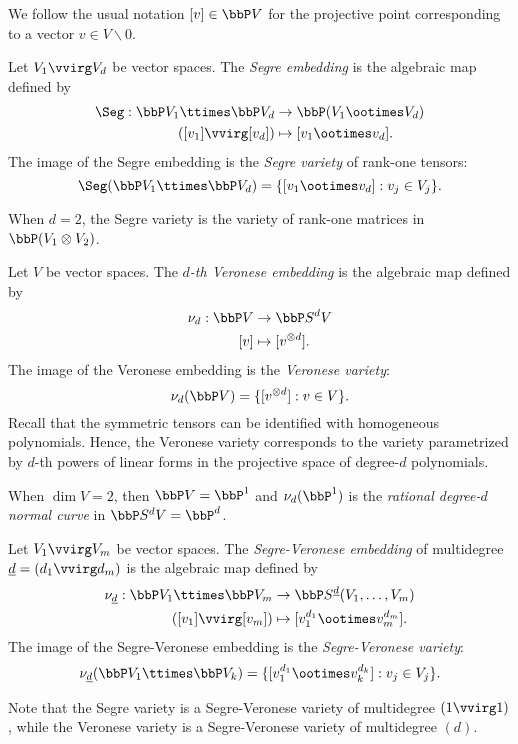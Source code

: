 We follow the usual notation $[v] \in \bbP V$ for the projective point corresponding to a vector $v \in V \smallsetminus 0$.

\begin{definition}
\label{introduction-definition-Segre}
Let $V_1 \vvirg V_d$ be vector spaces. The \emph{Segre embedding} is the algebraic map defined by 
\begin{align*}
\Seg: \bbP V_1 \ttimes \bbP V_d &\to \bbP (V_1 \ootimes V_d) \\
([v_1] \vvirg [v_d]) &\mapsto [v_1 \ootimes v_d].
\end{align*}
The image of the Segre embedding is the \emph{Segre variety} of rank-one tensors:
\[
\Seg( \bbP V_1 \ttimes \bbP V_d) =\{ [v_1 \ootimes v_d] : v_j \in V_j\}.
\]
\end{definition}
When $d = 2$, the Segre variety is the variety of rank-one matrices in $\bbP (V_1 \otimes V_2)$.

\begin{definition}
\label{introduction-definition-Veronese}
Let $V$ be vector spaces. The \emph{$d$-th Veronese embedding} is the algebraic map defined by 
\begin{align*}
    \nu_d : \bbP V &\to \bbP S^d V \\
    [v] &\mapsto [v^{\otimes d}].
\end{align*}
The image of the Veronese embedding is the \emph{Veronese variety}:
\[
    \nu_d( \bbP V ) =\{ [v^{\otimes d}] :  v \in V\}.
\]
Recall that the symmetric tensors can be identified with homogeneous polynomials. Hence, the Veronese variety corresponds to the variety parametrized by $d$-th powers of linear forms in the projective space of degree-$d$ polynomials. 

When $\dim V = 2$, then $\bbP V = \bbP^1$ and $\nu_d( \bbP^1)$ is the \emph{rational degree-$d$ normal curve} in $\bbP S^d V = \bbP^d$.
\end{definition}

\begin{definition}
\label{introduction-definition-SegreVeronese}
Let $V_1 \vvirg V_m$ be vector spaces. The \emph{Segre-Veronese embedding} of multidegree $\underline{d} = (d_1 \vvirg d_m)$ is the algebraic map defined by 
\begin{align*}
\nu_{\underline{d}} : \bbP V_1 \ttimes \bbP V_m &\to \bbP S^{\underline{d}}(V_1,\ldots,V_m) \\
([v_1] \vvirg [v_m]) &\mapsto [v_1^{ d_1} \ootimes v_m^{ d_m}].
\end{align*}
The image of the Segre-Veronese embedding is the \emph{Segre-Veronese variety}:
\[
\nu_{\underline{d}}( \bbP V_1 \ttimes \bbP V_k ) = \{ [v_1^{ d_1} \ootimes v_k^{ d_k}] :  v_j \in V_j\}.
\]
\end{definition}
Note that the Segre variety is a Segre-Veronese variety of multidegree $(1 \vvirg 1)$, while the Veronese variety is a Segre-Veronese variety of multidegree $(d)$.

